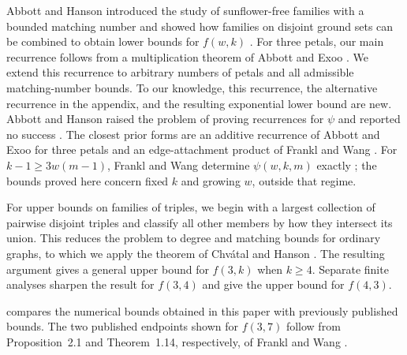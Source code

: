 \documentclass[11pt]{article}
\numberwithin{equation}{section}
\theoremstyle{definition}
\theoremstyle{remark}
\begin{document}
Abbott and Hanson introduced the study of sunflower-free families with a
bounded matching number and showed how families on disjoint ground sets can be
combined to obtain lower bounds for $f(w,k)$ \cite{AbbottHanson1974}. For
three petals, our main recurrence follows from a multiplication theorem of
Abbott and Exoo \cite{AbbottExoo1992}. We extend this recurrence to arbitrary
numbers of petals and all admissible matching-number bounds. To our knowledge,
this recurrence, the alternative recurrence in the appendix, and the resulting
exponential lower bound are new. Abbott and Hanson raised the problem of
proving recurrences for $\psi$ and reported no success
\cite[p.~11]{AbbottHanson1974}. The closest prior forms are an additive
recurrence of Abbott and Exoo for three petals
\cite[Theorem~3]{AbbottExoo1992} and an edge-attachment product of Frankl and
Wang \cite[Proposition~2.1]{FranklWang2025}. For $k-1\ge3w(m-1)$, Frankl
and Wang determine $\psi(w,k,m)$ exactly \cite[Theorem~1.11]{FranklWang2025};
the bounds proved here concern fixed $k$ and growing $w$, outside that
regime.

For upper bounds on families of triples, we begin with a largest collection of
pairwise disjoint triples and classify all other members by how they intersect
its union. This reduces the problem to degree and matching bounds for ordinary
graphs, to which we apply the theorem of Chv\'atal and Hanson
\cite{ChvatalHanson1976}. The resulting argument gives a general upper bound
for $f(3,k)$ when $k\ge4$. Separate finite analyses sharpen the result for
$f(3,4)$ and give the upper bound for $f(4,3)$.

 compares the numerical bounds obtained in this paper
with previously published bounds. The two published endpoints shown for
$f(3,7)$ follow from Proposition~2.1 and Theorem~1.14, respectively, of Frankl
and Wang \cite{FranklWang2025}.
\end{document}
